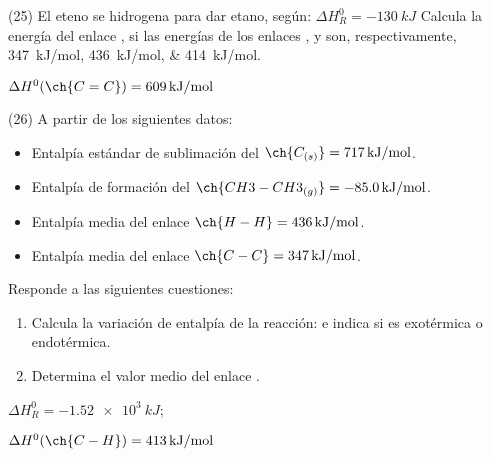 \documentclass[10pt]{article}
\begin{document}
\begin{multicols}{2}
\begin{exercise}[
    tags    = {},
    topics  = {química, termodinámica, termoquímica},
    source  = {FQ 1B MGH 2016, p168, e25},
  ]
  (25) El eteno se hidrogena para dar etano, según:
   \( \Delta H^0_R = \SI{-130}{kJ} \)
  Calcula la energía del enlace , si las energías de los
  enlaces ,  y  son, respectivamente, \SIlist{347;436;414}{kJ/mol}.
\end{exercise}

\begin{solution}
  \( \Delta H^0 (\ch{C=C}) = \SI{609}{kJ/mol} \)
\end{solution}





\begin{exercise}[
    tags    = {},
    topics  = {química, termodinámica, termoquímica},
    source  = {FQ 1B MGH 2016, p168, e26},
  ]
  (26) A partir de los siguientes datos:
  \begin{itemize}
    \item Entalpía estándar de sublimación del \( \ch{C_{(s)}} = \SI{717}{kJ/mol} \).
    \item Entalpía de formación del \( \ch{CH3-CH3_{(g)}} = \SI{-85,0}{kJ/mol} \).
    \item Entalpía media del enlace \( \ch{H-H} = \SI{436}{kJ/mol} \).
    \item Entalpía media del enlace \( \ch{C-C} = \SI{347}{kJ/mol} \).
  \end{itemize}
  Responde a las siguientes cuestiones: %
  \begin{enumerate}
    \item Calcula la variación de entalpía de la reacción:
     e indica si es exotérmica
    o endotérmica.
    \item Determina el valor medio del enlace .
  \end{enumerate}
\end{exercise}

\begin{solution}
  \begin{enumerate*}
    \item \( \Delta H^0_R = \SI{-1.52e3}{kJ} \); \item \( \Delta H^0 (\ch{C-H}) = \SI{413}{kJ/mol} \)
  \end{enumerate*}
\end{solution}







\end{multicols}
\end{document}

